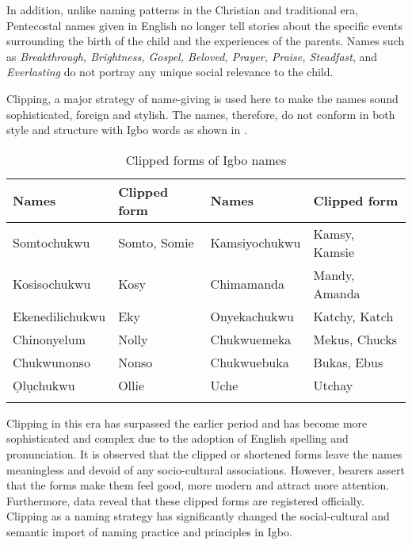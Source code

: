 \documentclass[output=paper]{langscibook}
\begin{document}
In addition, unlike naming patterns in the Christian and traditional era, Pentecostal names given in English no longer tell stories about the specific events surrounding the birth of the child and the experiences of the parents. Names such as \textit{Breakthrough, Brightness, Gospel, Beloved, Prayer, Praise, Steadfast}, and \textit{Everlasting} do not portray any unique social relevance to the child.

Clipping, a major strategy of name-giving is used here to make the names sound sophisticated, foreign and stylish. The names, therefore, do not conform in both style and structure with Igbo words as shown in .

\begin{table}
\caption{\label{tab:owaleke:4.6} Clipped forms of Igbo names}
\begin{tabular}{llll}
\lsptoprule
Names & Clipped form & Names & Clipped form\\
\midrule
Somtochukwu &Somto, Somie &	Kamsiyochukwu &	Kamsy, Kamsie\\
Kosisochukwu &	Kosy & Chimamanda &	Mandy, Amanda\\
Ekenedilichukwu	& Eky &	Onyekachukwu &	Katchy, Katch \\
Chinonyelum	& Nolly &Chukwuemeka &	Mekus, Chucks\\
Chukwunonso	& Nonso &	Chukwuebuka	&Bukas, Ebus\\
Ọlụchukwu & Ollie & Uche & Utchay\\
\lspbottomrule
\end{tabular}
\end{table}

Clipping in this era has surpassed the earlier period and has become more sophisticated and complex due to the adoption of English spelling and pronunciation.  It is observed that the clipped or shortened forms leave the names meaningless and devoid of any socio-cultural associations. However, bearers assert that the forms make them feel good, more modern and attract more attention. Furthermore, data reveal that these clipped forms are registered officially. Clipping as a naming strategy has significantly changed the social-cultural and semantic import of naming practice and principles in Igbo.
\end{document}
